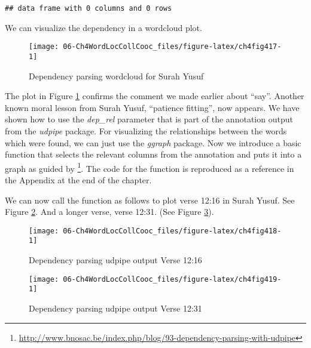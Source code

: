 \documentclass[
]{article}
\begin{document}
\begin{verbatim}
## data frame with 0 columns and 0 rows
\end{verbatim}

\normalsize

We can visualize the dependency in a wordcloud plot.

\begin{figure}

{\centering \texttt{[image: 06-Ch4WordLocCollCooc\_files/figure-latex/ch4fig417-1]} 

}

\caption{Dependency parsing wordcloud for Surah Yusuf}\label{fig:ch4fig417}
\end{figure}

The plot in Figure \ref{fig:ch4fig417} confirms the comment we made earlier about ``say''. Another known moral lesson from Surah Yusuf, ``patience fitting'', now appears.
We have shown how to use the \emph{dep\_rel} parameter that is part of the annotation output from the \emph{udpipe} package. For visualizing the relationships between the words which were found, we can just use the \emph{ggraph} package. Now we introduce a basic function that selects the relevant columns from the annotation and puts it into a graph as guided by \citet{udpipe} \footnote{\url{http://www.bnosac.be/index.php/blog/93-dependency-parsing-with-udpipe}}. The code for the function is reproduced as a reference in the Appendix at the end of the chapter.

We can now call the function as follows to plot verse 12:16 in Surah Yusuf. See Figure \ref{fig:ch4fig418}. And a longer verse, verse 12:31. (See Figure \ref{fig:ch4fig419}).

\begin{figure}

{\centering \texttt{[image: 06-Ch4WordLocCollCooc\_files/figure-latex/ch4fig418-1]} 

}

\caption{Dependency parsing udpipe output Verse 12:16}\label{fig:ch4fig418}
\end{figure}

\begin{figure}

{\centering \texttt{[image: 06-Ch4WordLocCollCooc\_files/figure-latex/ch4fig419-1]} 

}

\caption{Dependency parsing udpipe output Verse 12:31}\label{fig:ch4fig419}
\end{figure}
\end{document}
